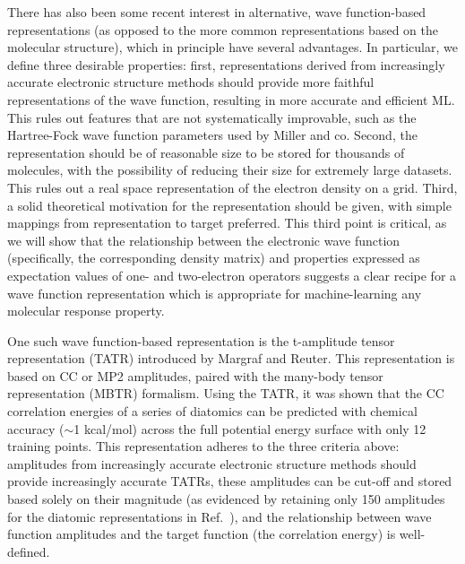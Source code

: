 There has also been some recent interest in alternative, wave function-based representations (as opposed to the more common representations based on the molecular structure), which in principle have several advantages. In particular, we define three desirable properties: 
first, representations derived from increasingly accurate electronic structure methods should provide more faithful representations of the wave function, resulting in more accurate and efficient ML. 
This rules out features that are not systematically improvable, such as the Hartree-Fock wave function parameters used by Miller and co.\cite{Welborn2018a,Cheng2019} 
Second, the representation should be of reasonable size to be stored for thousands of molecules, with the possibility of reducing their size for extremely large datasets. This rules out a real space representation of the electron density on a grid\cite{Snyder2012}.
Third, a solid theoretical motivation for the representation should be given, with simple mappings from representation to target preferred. 
This third point is critical, as we will show that the relationship between the electronic wave function (specifically, the corresponding density matrix) and properties expressed as expectation values of one- and two-electron operators suggests a clear recipe for a wave function representation which is appropriate for machine-learning any molecular response property. 

One such wave function-based representation is the t-amplitude tensor representation (TATR) introduced by Margraf and Reuter\cite{Margraf2018}. This representation is based on CC or MP2 amplitudes, paired with the many-body tensor representation (MBTR) formalism\cite{Rupp2018}. Using the TATR, it was shown that the CC correlation energies of a series of diatomics can be predicted with chemical accuracy ($\sim$1 kcal/mol) across the full potential energy surface with only 12 training points. This representation adheres to the three criteria above: amplitudes from increasingly accurate electronic structure methods should provide increasingly accurate TATRs, these amplitudes can be cut-off and stored based solely on their magnitude (as evidenced by retaining only 150 amplitudes for the diatomic representations in Ref.~), and the relationship between wave function amplitudes and the target function (the correlation energy) is well-defined. 

